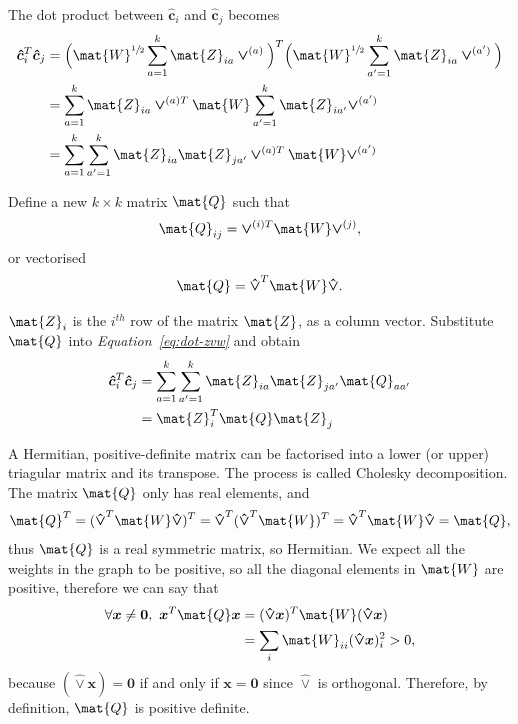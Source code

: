 \documentclass[12pt]{report}
\begin{document}
%
%


The dot product between $\bm{\hat{c}}_i$ and $\bm{\hat{c}}_j$ becomes
\begin{align}
  \bm{\hat{c}}^T_i \bm{\hat{c}}_j &=
    \Big(\mat{W}^{\sfrac{1}{2}} \sum_{a=1}^{k} \mat{Z}_{ia} \bm{\vee}^{(a)} \Big)^T
    \Big(\mat{W}^{\sfrac{1}{2}} \sum_{a'=1}^{k} \mat{Z}_{ia} \bm{\vee}^{(a')} \Big)
  \\
  &= \sum_{a=1}^{k} \mat{Z}_{ia} \bm{\vee}^{(a)T} \mat{W}
    \sum_{a'=1}^{k} \mat{Z}_{ia'} \bm{\vee}^{(a')}
  \\
  &= \sum_{a=1}^k \sum_{a'=1}^k \mat{Z}_{ia} \mat{Z}_{ja'}
    \bm{\vee}^{(a)T} \mat{W} \bm{\vee}^{(a')} \label{eq:dot-zvw}
\end{align}


%
%


Define a new $k \times k$ matrix $\mat{Q}$ such that
\begin{equation}
  \label{eq:q-ij}
  \mat{Q}_{ij} = \bm{\vee}^{(i)T} \mat{W} \bm{\vee}^{(j)},
\end{equation}
or vectorised
\begin{equation}
  \label{eq:q-vectorised}
  \mat{Q} = \bm{\hat{\vee}}^T \mat{W} \bm{\hat{\vee}}.
\end{equation}

$\mat{Z}_i$ is the $i^{th}$ row of the matrix $\mat{Z}$, as a column vector.
Substitute $\mat{Q}$ into \emph{Equation~\ref{eq:dot-zvw}} and obtain
\begin{align}
  \bm{\hat{c}}_i^T \bm{\hat{c}}_j &= \sum_{a=1}^k \sum_{a'=1}^k
    \mat{Z}_{ia} \mat{Z}_{ja'} \mat{Q}_{aa'} \label{eq:dot-zq-sum} \\
  &= \mat{Z}_i^T \mat{Q} \mat{Z}_j \label{eq:dot-zq-vectorised}
\end{align}

%
%

A Hermitian, positive-definite matrix can be factorised into a lower (or upper)
triagular matrix and its transpose. The process is called Cholesky decomposition.
The matrix $\mat{Q}$ only has real elements, and
\begin{align}
  \mat{Q}^T = (\bm{\hat{\vee}}^T \mat{W} \bm{\hat{\vee}})^T
    = \bm{\hat{\vee}}^T (\bm{\hat{\vee}}^T \mat{W})^T
    = \bm{\hat{\vee}}^T \mat{W} \bm{\hat{\vee}} = \mat{Q},
\end{align}
thus $\mat{Q}$ is a real symmetric matrix, so Hermitian. We expect all the
weights in the graph to be positive, so all the diagonal elements in $\mat{W}$
are positive, therefore we can say that
\begin{align}
  \forall \bm{x} \neq \bm{0},\  \bm{x}^T \mat{Q} \bm{x} &=
     (\bm{\hat{\vee}}\bm{x})^T \mat{W} (\bm{\hat{\vee}}\bm{x}) \\
     &= \sum_i \mat{W}_{ii} (\bm{\hat{\vee}}\bm{x})_i^2 > 0,
\end{align}
because $(\bm{\hat{\vee}}\bm{x}) = \bm{0}$ if and only if $\bm{x} = \bm{0}$
since $\bm{\hat{\vee}}$ is orthogonal. Therefore, by definition, $\mat{Q}$ is
positive definite.
\end{document}
